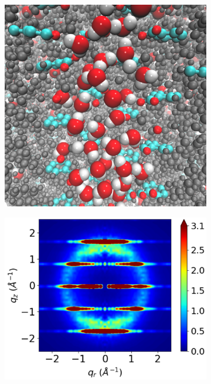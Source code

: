 \documentclass[journal=jpcbfk,manuscript=article]{achemso}
\begin{document}
\begin{figure}[!htb]
\begin{subfigure}{0.325\linewidth}
	\label{fig:staggered}
  \end{subfigure}
  \begin{subfigure}{0.325\linewidth}
  	\centering
  	\includegraphics[width=\textwidth]{solvated_pore_cross_section.pdf}  %
  	\label{fig:solvated_pore}
  \end{subfigure}
  \begin{subfigure}{0.325\linewidth}
  	\centering
  	\includegraphics[width=\textwidth]{rotated_monomers_rzplot_restrained.pdf}

\end{subfigure}
\end{figure}
\end{document}
